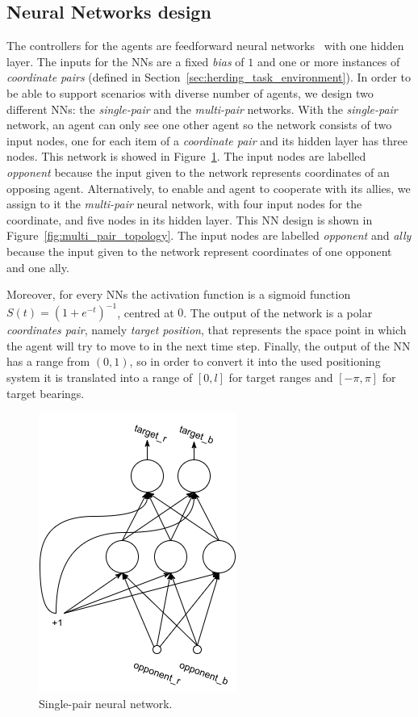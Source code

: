 \documentclass[conference]{IEEEtran}
\begin{document}
\subsection{Neural Networks design}
\label{sec:NN_design}
The controllers for the agents are feedforward neural networks~\cite{bebis1994feed} with one hidden layer.
The inputs for the NNs are a fixed \textit{bias} of $1$ and one or more instances of \textit{coordinate pairs} (defined in Section~\ref{sec:herding_task_environment}).
In order to be able to support scenarios with diverse number of agents, we design two different NNs: the \textit{single-pair} and the \textit{multi-pair} networks. 
With the \textit{single-pair} network, an agent can only see one other agent so the network consists of two input nodes, one for each item of a \textit{coordinate pair} and its hidden layer has three nodes. 
This network is showed in Figure~\ref{fig:single_pair_topology}.
The input nodes are labelled \textit{opponent} because the input given to the network represents coordinates of an opposing agent.
Alternatively, to enable and agent to cooperate with its allies, we assign to it the \textit{multi-pair} neural network, with four input nodes for the coordinate, and five nodes in its hidden layer.
This NN design is shown in Figure~\ref{fig:multi_pair_topology}.
The input nodes are labelled \textit{opponent} and \textit{ally} because the input given to the network represent coordinates of one opponent and one ally.

Moreover, for every NNs the activation function is a sigmoid function $S(t) = (1 + e^{-t})^{-1}$, centred at $0$. 
The output of the network is a polar \textit{coordinates pair}, namely \textit{target position}, that represents the space point in which the agent will try to move to in the next time step.
Finally, the output of the NN has a range from $(0, 1)$, so in order to convert it into the used positioning system it is  translated into a range of $[0, l]$ for target ranges and $[-\pi, \pi]$ for target bearings. 
 
\begin{figure}[t]
	\centering
	\includegraphics[width=0.5\hsize]{imgs/nn-design_single.png}
	\caption{Single-pair neural network.}
	\label{fig:single_pair_topology}
\end{figure}
\end{document}
